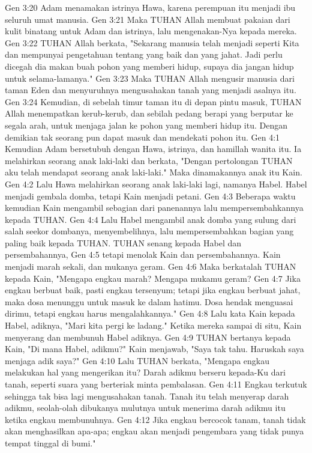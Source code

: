 Gen 3:20  Adam menamakan istrinya Hawa, karena perempuan itu menjadi ibu seluruh umat manusia.
Gen 3:21  Maka TUHAN Allah membuat pakaian dari kulit binatang untuk Adam dan istrinya, lalu mengenakan-Nya kepada mereka.
Gen 3:22  TUHAN Allah berkata, "Sekarang manusia telah menjadi seperti Kita dan mempunyai pengetahuan tentang yang baik dan yang jahat. Jadi perlu dicegah dia makan buah pohon yang memberi hidup, supaya dia jangan hidup untuk selama-lamanya."
Gen 3:23  Maka TUHAN Allah mengusir manusia dari taman Eden dan menyuruhnya mengusahakan tanah yang menjadi asalnya itu.
Gen 3:24  Kemudian, di sebelah timur taman itu di depan pintu masuk, TUHAN Allah menempatkan kerub-kerub, dan sebilah pedang berapi yang berputar ke segala arah, untuk menjaga jalan ke pohon yang memberi hidup itu. Dengan demikian tak seorang pun dapat masuk dan mendekati pohon itu.
Gen 4:1  Kemudian Adam bersetubuh dengan Hawa, istrinya, dan hamillah wanita itu. Ia melahirkan seorang anak laki-laki dan berkata, "Dengan pertolongan TUHAN aku telah mendapat seorang anak laki-laki." Maka dinamakannya anak itu Kain.
Gen 4:2  Lalu Hawa melahirkan seorang anak laki-laki lagi, namanya Habel. Habel menjadi gembala domba, tetapi Kain menjadi petani.
Gen 4:3  Beberapa waktu kemudian Kain mengambil sebagian dari panenannya lalu mempersembahkannya kepada TUHAN.
Gen 4:4  Lalu Habel mengambil anak domba yang sulung dari salah seekor dombanya, menyembelihnya, lalu mempersembahkan bagian yang paling baik kepada TUHAN. TUHAN senang kepada Habel dan persembahannya,
Gen 4:5  tetapi menolak Kain dan persembahannya. Kain menjadi marah sekali, dan mukanya geram.
Gen 4:6  Maka berkatalah TUHAN kepada Kain, "Mengapa engkau marah? Mengapa mukamu geram?
Gen 4:7  Jika engkau berbuat baik, pasti engkau tersenyum; tetapi jika engkau berbuat jahat, maka dosa menunggu untuk masuk ke dalam hatimu. Dosa hendak menguasai dirimu, tetapi engkau harus mengalahkannya."
Gen 4:8  Lalu kata Kain kepada Habel, adiknya, "Mari kita pergi ke ladang." Ketika mereka sampai di situ, Kain menyerang dan membunuh Habel adiknya.
Gen 4:9  TUHAN bertanya kepada Kain, "Di mana Habel, adikmu?" Kain menjawab, "Saya tak tahu. Haruskah saya menjaga adik saya?"
Gen 4:10  Lalu TUHAN berkata, "Mengapa engkau melakukan hal yang mengerikan itu? Darah adikmu berseru kepada-Ku dari tanah, seperti suara yang berteriak minta pembalasan.
Gen 4:11  Engkau terkutuk sehingga tak bisa lagi mengusahakan tanah. Tanah itu telah menyerap darah adikmu, seolah-olah dibukanya mulutnya untuk menerima darah adikmu itu ketika engkau membunuhnya.
Gen 4:12  Jika engkau bercocok tanam, tanah tidak akan menghasilkan apa-apa; engkau akan menjadi pengembara yang tidak punya tempat tinggal di bumi."
